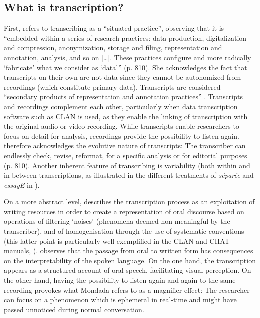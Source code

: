 \documentclass[output=paper,colorlinks,citecolor=brown,modfonts,nonflat]{../langscibook}
\begin{document}
\subsection{ \textbf{What is transcription?}}%

First, \citet{Mondada2007} refers to transcribing as a “situated practice”, observing that it is “embedded within a series of research practices: data production, digitalization and compression, anonymization, storage and filing, representation and annotation, analysis, and so on […]. These practices configure and more radically ‘fabricate’ what we consider as ‘data’” (p. 810). She acknowledges the fact that transcripts on their own are not data since they cannot be autonomized from recordings (which constitute primary data). Transcripts are considered “secondary products of representation and annotation practices” \citep[810-811]{Mondada2007}. Transcripts and recordings complement each other, particularly when data transcription software such as CLAN is used, as they enable the linking of transcription with the original audio or video recording. While transcripts enable researchers to focus on detail for analysis, recordings provide the possibility to listen again. \citeauthor{Mondada2007} therefore acknowledges the evolutive nature of transcripts: The transcriber can endlessly check, revise, reformat, for a specific analysis or for editorial purposes (p. 810). Another inherent feature of transcribing is variability (both within and in-between transcriptions, as illustrated in the different treatments of \textit{séparée} and \textit{essayE} in ).

On a more abstract level, \citet{Mondada2000} describes the transcription process as an exploitation of writing resources in order to create a representation of oral discourse based on operations of filtering ‘noises’ (phenomena deemed non-meaningful by the transcriber), and of homogenisation through the use of systematic conventions (this latter point is particularly well exemplified in the CLAN and CHAT manuals, \citealt{MacWhinney2000}). \citet{Mondada2000} observes that the passage from oral to written form has consequences on the interpretability of the spoken language. On the one hand, the transcription appears as a structured account of oral speech, facilitating visual perception. On the other hand, having the possibility to listen again and again to the same recording provokes what Mondada refers to as a magnifier effect: The researcher can focus on a phenomenon which is ephemeral in real-time and might have passed unnoticed during normal conversation.
\end{document}
